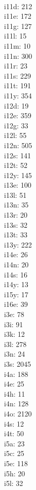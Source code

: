 \begin{multicols}{8}
  \\ i11d: 212
  \\ i11e: 172
  \\ i11g: 127
  \\ i11l: 15
  \\ i11m: 10
  \\ i11n: 300
  \\ i11r: 23
  \\ i11s: 229
  \\ i11t: 191
  \\ i11y: 354
  \\ i12d: 19
  \\ i12e: 359
  \\ i12g: 33
  \\ i12l: 55
  \\ i12n: 505
  \\ i12s: 141
  \\ i12t: 52
  \\ i12y: 145
  \\ i13e: 100
  \\ i13l: 51
  \\ i13n: 35
  \\ i13r: 20
  \\ i13s: 32
  \\ i13t: 33
  \\ i13y: 222
  \\ i14e: 26
  \\ i14n: 20
  \\ i14s: 16
  \\ i14y: 13
  \\ i15y: 17
  \\ i16e: 39
  \\ i3e: 78
  \\ i3i: 91
  \\ i3k: 12
  \\ i3l: 278
  \\ i3n: 24
  \\ i3s: 2045
  \\ i4a: 188
  \\ i4e: 25
  \\ i4h: 11
  \\ i4n: 128
  \\ i4o: 2120
  \\ i4s: 12
  \\ i4t: 50
  \\ i5a: 23
  \\ i5c: 25
  \\ i5e: 118
  \\ i5h: 20
  \\ i5l: 32

\end{multicols}
